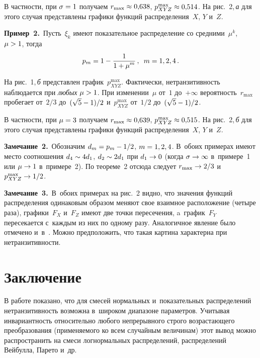 \begin{multicols}{2}
В частности, при $\sigma\hm=1$ получаем $r_{\max}\hm\approx 0{,}638$,
 $p_{XYZ}^{\max}\hm\approx 0{,}514$. На рис.~2,\,\textit{а}
для этого случая пред\-став\-ле\-ны графики функций распределения~$X$, 
$Y$ и~$Z$.



\smallskip

\noindent
\textbf{Пример~2.}\ Пусть~$\xi_k$ имеют показательное распределение со 
средними~$\mu^k$, $\mu\hm>1$, тогда
$$
p_m=1-\displaystyle\frac{\displaystyle 1\mathstrut}{\displaystyle 1+\mu^m\mathstrut}\,,\enskip m=1, 2, 4\,.
$$

На рис.~1,\,\textit{б} пред\-став\-лен график~$p_{XYZ}^{\max}$.
Фактически, нетранзитивность наблюдается при \textit{любых} $\mu\hm>1$.
При изменении~$\mu$ от~$1$ до~$+\infty$ вероятность~$r_{\max}$ пробегает от~$2/3$ 
до~$(\sqrt{5}\hm-1)/2$
и~$p_{XYZ}^{\max}$ от~$1/2$ до~$(\sqrt{5}\hm-1)/2$.




В частности, при $\mu\hm=3$ получаем $r_{\max}\hm\approx 0{,}639$, 
$p_{XYZ}^{\max}\hm\approx 0{,}515$.
На рис.~2,\,\textit{б} для этого случая пред\-став\-ле\-ны графики функций 
распределения~$X$, $Y$ и~$Z$.

\smallskip

\noindent
\textbf{Замечание~2.}\ Обозначим $d_m\hm=p_m\hm-1/2$, $m\hm=1, 2, 4$. 
В~обоих примерах имеют место соотношения $d_4\hm\sim 4d_1$, $d_2\hm\sim 2d_1$ при
$d_1\hm\to 0$ (когда $\sigma\hm\to\infty$ в~примере~1 или $\mu\hm\to 1$ в~примере~2). 
По теореме~2 отсюда следует
$r_{\max}\hm\to 2/3$ и~$p_{XYZ}^{\max}\hm\to 1/2$.

\smallskip

\noindent
\textbf{Замечание~3.}\ 
В~обоих примерах на рис.~2 видно, что значения функций распределения одинаковым 
образом меняют свое взаимное расположение (четыре раза), графики~$F_X$ и~$F_Z$ 
имеют две точки
пересечения, a~график~$F_Y$ пересекается с~каждым из них по одному разу. 
Аналогичное явление
было отмечено и~в~\cite{Leb-2019}. Можно предположить, что такая картина 
характерна при нетранзитивности.


\section{Заключение}


В работе показано, что для смесей нормальных и~показательных распределений нетранзитивность
возможна в~широком диапазоне параметров. Учитывая инвариантность относительно  любого непрерывного строго возрастающего
преобразования (применяемого ко всем случайным величинам) этот вывод можно распространить на
смеси логнормальных распределений, распределений Вейбулла, Парето и~др.


\end{multicols}
